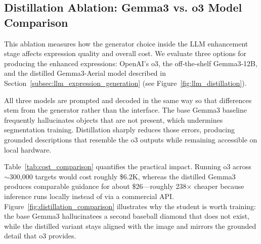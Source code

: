 \subsection{Distillation Ablation: Gemma3 vs. o3 Model Comparison}
\label{subsec:distillation_ablation}

This ablation measures how the generator choice inside the LLM enhancement stage affects expression quality and overall cost. We evaluate three options for producing the enhanced expressions: OpenAI’s o3, the off‑the‑shelf Gemma3‑12B, and the distilled Gemma3-Aerial model described in Section~\ref{subsec:llm_expression_generation} (see Figure~\ref{fig:llm_distillation}).

All three models are prompted and decoded in the same way so that differences stem from the generator rather than the interface. The base Gemma3 baseline frequently hallucinates objects that are not present, which undermines segmentation training. Distillation sharply reduces those errors, producing grounded descriptions that resemble the o3 outputs while remaining accessible on local hardware.

Table~\ref{tab:cost_comparison} quantifies the practical impact. Running o3 across \(\sim\)300{,}000 targets would cost roughly \$6.2K, whereas the distilled Gemma3 produces comparable guidance for about \$26—roughly 238× cheaper because inference runs locally instead of via a commercial API. Figure~\ref{fig:distillation_comparison} illustrates why the student is worth training: the base Gemma3 hallucinatees a second baseball diamond that does not exist, while the distilled variant stays aligned with the image and mirrors the grounded detail that o3 provides.

\begin{table}[t]
\centering
\caption{Cost Analysis: Gemma3 vs. o3 Model for Large-Scale Annotation\protect\footnotemark}
\label{tab:cost_comparison}
\end{table}

